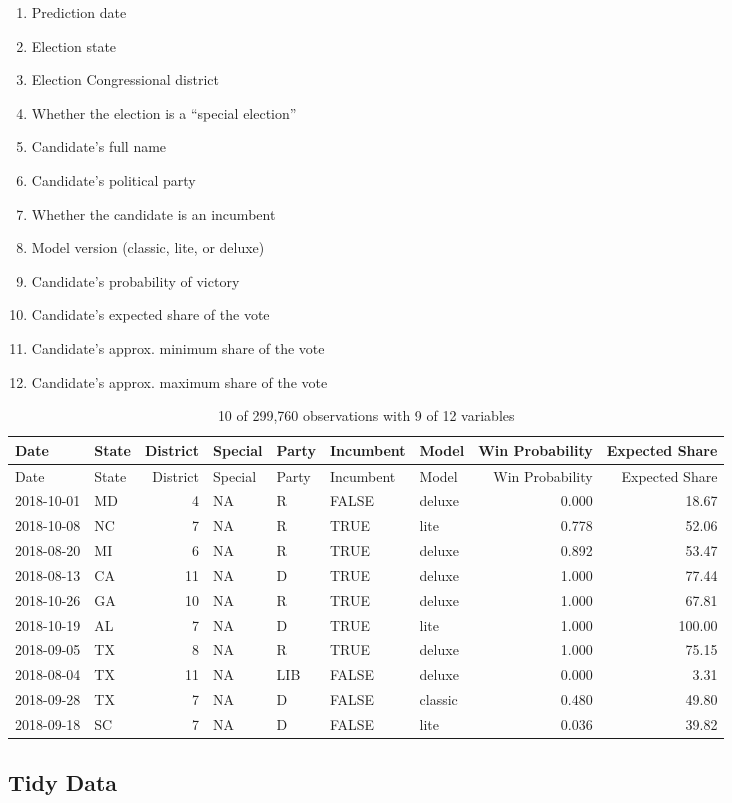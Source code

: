 \documentclass[]{article}
\providecommand{\tightlist}{%
  \setlength{\itemsep}{0pt}\setlength{\parskip}{0pt}}
\begin{document}
\begin{enumerate}
\def\labelenumi{\arabic{enumi}.}
\tightlist
\item
  Prediction date
\item
  Election state
\item
  Election Congressional district
\item
  Whether the election is a ``special election''
\item
  Candidate's full name
\item
  Candidate's political party
\item
  Whether the candidate is an incumbent
\item
  Model version (classic, lite, or deluxe)
\item
  Candidate's probability of victory
\item
  Candidate's expected share of the vote
\item
  Candidate's approx. minimum share of the vote
\item
  Candidate's approx. maximum share of the vote
\end{enumerate}

\begin{longtable}[]{@{}llrllllrr@{}}
\caption{10 of 299,760 observations with 9 of 12
variables}\tabularnewline
\toprule
Date & State & District & Special & Party & Incumbent & Model & Win
Probability & Expected Share\tabularnewline
\midrule
\endfirsthead
\toprule
Date & State & District & Special & Party & Incumbent & Model & Win
Probability & Expected Share\tabularnewline
\midrule
\endhead
2018-10-01 & MD & 4 & NA & R & FALSE & deluxe & 0.000 &
18.67\tabularnewline
2018-10-08 & NC & 7 & NA & R & TRUE & lite & 0.778 &
52.06\tabularnewline
2018-08-20 & MI & 6 & NA & R & TRUE & deluxe & 0.892 &
53.47\tabularnewline
2018-08-13 & CA & 11 & NA & D & TRUE & deluxe & 1.000 &
77.44\tabularnewline
2018-10-26 & GA & 10 & NA & R & TRUE & deluxe & 1.000 &
67.81\tabularnewline
2018-10-19 & AL & 7 & NA & D & TRUE & lite & 1.000 &
100.00\tabularnewline
2018-09-05 & TX & 8 & NA & R & TRUE & deluxe & 1.000 &
75.15\tabularnewline
2018-08-04 & TX & 11 & NA & LIB & FALSE & deluxe & 0.000 &
3.31\tabularnewline
2018-09-28 & TX & 7 & NA & D & FALSE & classic & 0.480 &
49.80\tabularnewline
2018-09-18 & SC & 7 & NA & D & FALSE & lite & 0.036 &
39.82\tabularnewline
\bottomrule
\end{longtable}

\subsection{Tidy Data}\label{tidy-data}
\end{document}

